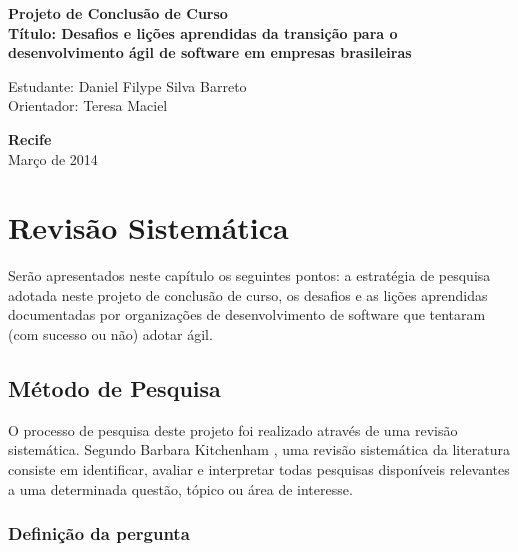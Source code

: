 \documentclass[a4paper,11pt]{article}
\begin{document}
\begin{center}
{\Large \bf  Projeto de Conclusão de Curso}\\[1cm]
{\Large \bf Título: Desafios e lições aprendidas da transição para o desenvolvimento ágil de software em empresas brasileiras} \\[3cm]
\end{center}
{\Large  Estudante: Daniel Filype Silva Barreto}\\[6mm]
{\Large  Orientador: Teresa Maciel}\\[6mm]
\vspace{3.0cm}
\begin{center}
{\large {\bf Recife}\\[6mm]
Março de 2014}
\end{center}

\newpage
\pagestyle {plain}
\setcounter{page}{0} 

\section{Revisão Sistemática}
	Serão apresentados neste capítulo os seguintes pontos: a estratégia de pesquisa adotada neste projeto de conclusão de curso, os desafios e as lições aprendidas documentadas por organizações de desenvolvimento de software que tentaram (com sucesso ou não) adotar ágil.
	\subsection{Método de Pesquisa}
		O processo de pesquisa deste projeto foi realizado através de  uma revisão sistemática. Segundo Barbara Kitchenham \cite{Barbara04}, uma revisão sistemática da literatura consiste em identificar, avaliar e interpretar todas pesquisas disponíveis relevantes a uma determinada questão, tópico ou área de interesse. 
		\subsubsection{Definição da pergunta}
\end{document}
